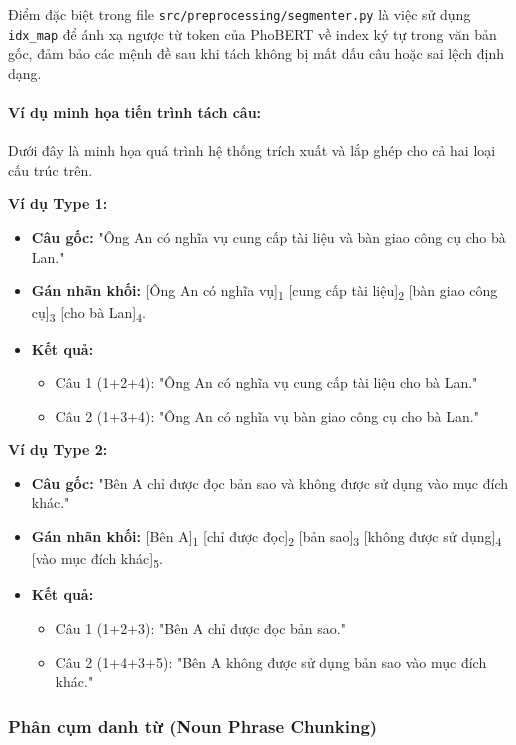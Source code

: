 Điểm đặc biệt trong file \texttt{src/preprocessing/segmenter.py} là việc sử dụng \texttt{idx\_map} để ánh xạ ngược từ token của PhoBERT về index ký tự trong văn bản gốc, đảm bảo các mệnh đề sau khi tách không bị mất dấu câu hoặc sai lệch định dạng.

\paragraph{Ví dụ minh họa tiến trình tách câu:}
Dưới đây là minh họa quá trình hệ thống trích xuất và lắp ghép cho cả hai loại cấu trúc trên.

\textbf{Ví dụ Type 1:}
\begin{itemize}
    \item \textbf{Câu gốc:} "Ông An có nghĩa vụ cung cấp tài liệu và bàn giao công cụ cho bà Lan."
    \item \textbf{Gán nhãn khối:} [Ông An có nghĩa vụ]\textsubscript{1} [cung cấp tài liệu]\textsubscript{2} [bàn giao công cụ]\textsubscript{3} [cho bà Lan]\textsubscript{4}.
    \item \textbf{Kết quả:}
    \begin{itemize}
        \item Câu 1 (1+2+4): "Ông An có nghĩa vụ cung cấp tài liệu cho bà Lan."
        \item Câu 2 (1+3+4): "Ông An có nghĩa vụ bàn giao công cụ cho bà Lan."
    \end{itemize}
\end{itemize}

\textbf{Ví dụ Type 2:}
\begin{itemize}
    \item \textbf{Câu gốc:} "Bên A chỉ được đọc bản sao và không được sử dụng vào mục đích khác."
    \item \textbf{Gán nhãn khối:} [Bên A]\textsubscript{1} [chỉ được đọc]\textsubscript{2} [bản sao]\textsubscript{3} [không được sử dụng]\textsubscript{4} [vào mục đích khác]\textsubscript{5}.
    \item \textbf{Kết quả:}
    \begin{itemize}
        \item Câu 1 (1+2+3): "Bên A chỉ được đọc bản sao."
        \item Câu 2 (1+4+3+5): "Bên A không được sử dụng bản sao vào mục đích khác."
    \end{itemize}
\end{itemize}

\subsubsection{Phân cụm danh từ (Noun Phrase Chunking)}

